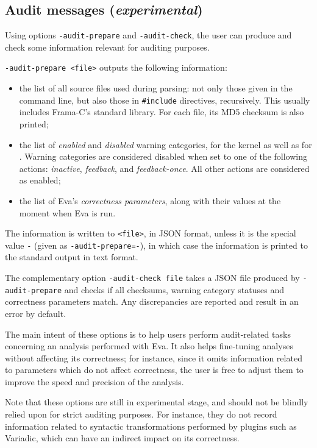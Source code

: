 \documentclass{frama-c-book}
\begin{document}
\subsection{Audit messages ({\em experimental})}

Using options \lstinline|-audit-prepare| and \lstinline|-audit-check|, the
user can produce and check some information relevant for auditing purposes.

\lstinline|-audit-prepare <file>| outputs the following information:

\begin{itemize}
\item the list of all source files used during parsing: not only those
  given in the command line, but also those in \lstinline|#include|
  directives, recursively. This usually includes Frama-C's standard library.
  For each file, its MD5 checksum is also printed;
\item the list of {\em enabled} and {\em disabled} warning categories,
  for the kernel as well as for \Eva{}. Warning categories are considered
  disabled when set to one of the following actions: {\em inactive},
  {\em feedback}, and {\em feedback-once}. All other actions are considered
  as enabled;
\item the list of Eva's {\em correctness parameters}, along with their values
  at the moment when Eva is run.
\end{itemize}

The information is written to \lstinline|<file>|, in JSON format, unless it
is the special value \lstinline|-| (given as \lstinline|-audit-prepare=-|),
in which case the information is printed to the standard output in text format.

The complementary option \lstinline|-audit-check file| takes a JSON file
produced by \lstinline|-audit-prepare| and checks if all checksums, warning
category statuses and correctness parameters match. Any discrepancies are
reported and result in an error by default.

The main intent of these options is to help users perform audit-related
tasks concerning an analysis performed with Eva. It also helps fine-tuning
analyses without affecting its correctness; for instance, since it omits
information related to parameters which do not affect correctness, the user
is free to adjust them to improve the speed and precision of the analysis.

Note that these options are still in experimental stage, and should not be
blindly relied upon for strict auditing purposes. For instance, they do
not record information related to syntactic transformations performed by
plugins such as \textsf{Variadic}, which can have an indirect impact on
its correctness.
\end{document}
